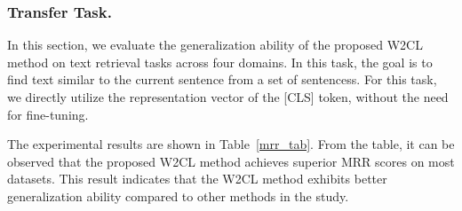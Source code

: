\subsubsection{Transfer Task.}In this section, we evaluate the generalization ability of the proposed W2CL method on text retrieval tasks across four domains. In this task, the goal is to find text similar to the current sentence from a set of sentencess. For this task, we directly utilize the representation vector of the [CLS] token, without the need for fine-tuning.

The experimental results are shown in Table~\ref{mrr_tab}. From the table, it can be observed that the proposed W2CL method achieves superior MRR scores on most datasets. This result indicates that the W2CL method exhibits better generalization ability compared to other methods in the study.

